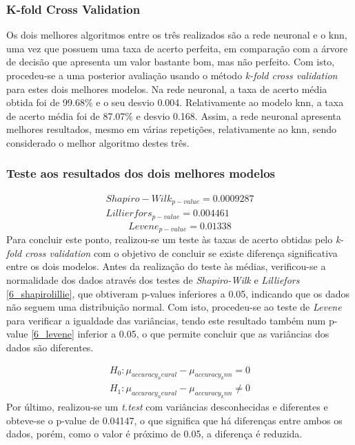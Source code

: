 \documentclass[conference]{IEEEtran}
\begin{document}
\subsubsection{K-fold Cross Validation}
Os dois melhores algoritmos entre os três realizados são a rede neuronal e o knn, uma vez que possuem uma taxa de acerto perfeita, em comparação com a árvore de decisão que apresenta um valor bastante bom, mas não perfeito.
Com isto, procedeu-se a uma posterior avaliação usando o método \textit{k-fold cross validation} para estes dois melhores modelos. Na rede neuronal, a taxa de acerto média obtida foi de 99.68\% e o seu desvio 0.004. Relativamente ao modelo knn, a taxa de acerto média foi de 87.07\% e desvio 0.168. Assim, a rede neuronal apresenta melhores resultados, mesmo em várias repetições, relativamente ao knn, sendo considerado o melhor algoritmo destes três.


\subsubsection{Teste aos resultados dos dois melhores modelos}
\begin{equation}
  \begin{array}{l}
	Shapiro-Wilk_{p-value}=0.0009287 \\
	Lillierfors_{p-value}=0.004461
	\end{array}\label{6_shapirolillie}
\end{equation}
\begin{equation}
Levene_{p-value}=0.01338\label{6_levene}
\end{equation}
Para concluir este ponto, realizou-se um teste às taxas de acerto obtidas pelo \textit{k-fold cross validation} com o objetivo de concluir se existe diferença significativa entre os dois modelos. Antes da realização do teste às médias, verificou-se a normalidade dos dados através dos testes de \textit{Shapiro-Wilk} e \textit{Lilliefors} \eqref{6_shapirolillie}, que obtiveram p-values inferiores a 0.05, indicando que os dados não seguem uma distribuição normal. Com isto, procedeu-se ao teste de \textit{Levene} para verificar a igualdade das variâncias, tendo este resultado também num p-value \eqref{6_levene} inferior a 0.05, o que permite concluir que as variâncias dos dados são diferentes.

\begin{equation}
  \begin{array}{l}
    H_{0}:\mu _{accuracy_neural} - \mu _{accuracy_knn}=0 \\ 
    H_{1}:\mu _{accuracy_neural} - \mu _{accuracy_knn}\neq 0
  \end{array}\label{6_hypothesis}
\end{equation}
Por último, realizou-se um \textit{t.test} com variâncias desconhecidas e diferentes e obteve-se o p-value de 0.04147, o que significa que há diferenças entre ambos os dados, porém, como o valor é próximo de 0.05, a diferença é reduzida.
\end{document}
